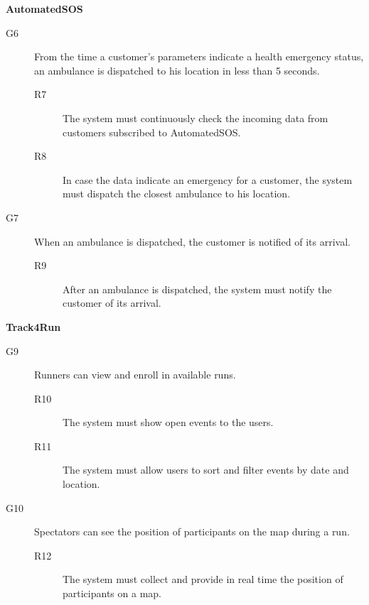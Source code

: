 \documentclass[../main.tex]{subfiles}
\begin{document}
\vspace{8mm}

{\bf AutomatedSOS}
\begin{description}
	\item [G6]  From the time a customer's parameters indicate a health emergency status, an ambulance is dispatched to his location in less than 5 seconds.
	\begin{description}
		\item [R7] The system must continuously check the incoming data from customers subscribed to AutomatedSOS.
		\item [R8] In case the data indicate an emergency for a customer, the system must dispatch the closest ambulance to his location.
	\end{description}

	\item [G7]  When an ambulance is dispatched, the customer is notified of its arrival.
	\begin{description}
		\item [R9] After an ambulance is dispatched, the system must notify the customer of its arrival.
	\end{description}
\end{description}

\vspace{8mm}

{\bf Track4Run}
\begin{description}

	\item [G9]  Runners can view and enroll in available runs.
	\begin{description}
		\item [R10] The system must show open events to the users.
		\item [R11] The system must allow users to sort and filter events by date and location.
	\end{description}

	\item [G10] Spectators can see the position of participants on the map during a run.
	\begin{description}
		\item [R12] The system must collect and provide in real time the position of participants on a map.
	\end{description}
\end{description}
\end{document}
